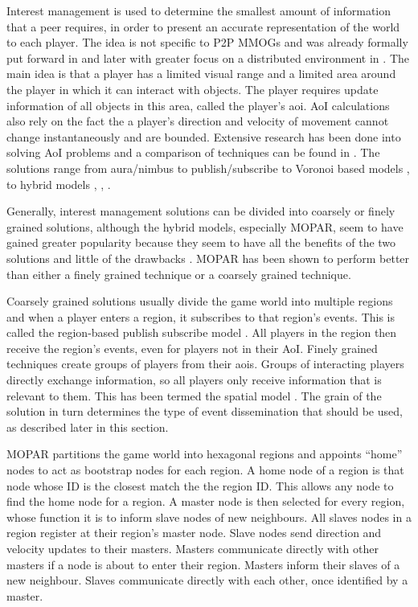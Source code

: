 \documentclass[10pt,a4paper,journal,cspaper,compsoc]{IEEEtran}
\begin{document}
Interest management is used to determine the smallest amount of information that a peer requires, in order to present an accurate representation of
the world to each player. The idea is not specific to P2P MMOGs and was already formally put forward in \cite{First_IM} and later with greater focus
on a distributed environment in \cite{Whang_agent_based_IM}. The main idea is that a player has a limited visual range and a limited area around the
player in which it can interact with objects. The player requires update information of all objects in this area, called the player's \ac{aoi}. AoI
calculations also rely on the fact the a player's direction and velocity of movement cannot change instantaneously and are bounded. Extensive
research has been done into solving AoI problems and a comparison of techniques can be found in \cite{Boulanger_IM_compare}. The solutions range from
aura/nimbus \cite{Benford_spatial_IM} to publish/subscribe \cite{mercury_publish_subscribe} to Voronoi based models \cite{Hu_voronoi_IM},
\cite{Buyukkaya_voronoi_state_management} to hybrid models \cite{hybrid_IM}, \cite{MOPAR}, \cite{fan_mediator_paper}.

Generally, interest management solutions can be divided into coarsely or finely grained solutions, although the hybrid models, especially MOPAR, seem
to have gained greater popularity because they seem to have all the benefits of the two solutions and little of the drawbacks \cite{MOPAR}. MOPAR has
been shown to perform better than either a finely grained technique or a coarsely grained technique.

Coarsely grained solutions usually divide the game world into multiple regions and when a player enters a region, it subscribes to that region's
events. This is called the region-based publish subscribe model \cite{Fan_deisgn_issues_p2p}. All players in the region then receive the region's
events, even for players not in their AoI. Finely grained techniques create groups of players from their \acp{aoi}. Groups of interacting players
directly exchange information, so all players only receive information that is relevant to them. This has been termed the spatial model
\cite{Fan_deisgn_issues_p2p}. The grain of the solution in turn determines the type of event dissemination that should be used, as described later in
this section.

MOPAR partitions the game world into hexagonal regions and appoints ``home'' nodes to act as bootstrap nodes for each region. A home node of a region
is that node whose ID is the closest match the the region ID. This allows any node to find the home node for a region. A master node is then selected
for every region, whose function it is to inform slave nodes of new neighbours. All slaves nodes in a region register at their region's master node.
Slave nodes send direction and velocity updates to their masters. Masters communicate directly with other masters if a node is about to enter their
region. Masters inform their slaves of a new neighbour. Slaves communicate directly with each other, once identified by a master.
\end{document}

